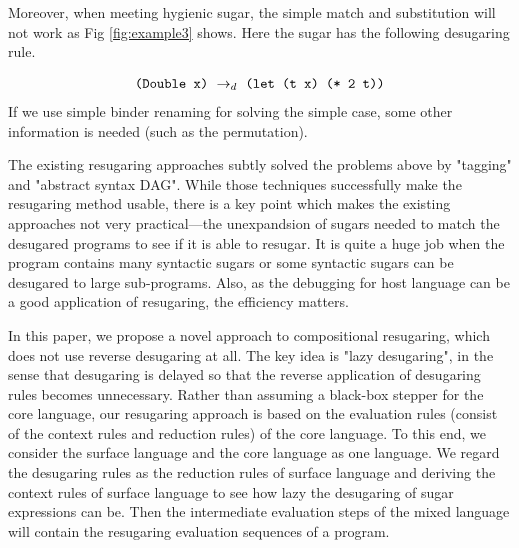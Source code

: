 Moreover, when meeting hygienic sugar, the simple match and substitution will not work as Fig \ref{fig:example3} shows. Here the  sugar has the following desugaring rule.

\[
\begin{array}{l}
\texttt{(Double x)} ~\rightarrow_d~ \texttt{(let (t x) (* 2 t))}\\
\end{array}
\]
If we use simple binder renaming for solving the simple case, some other information is needed (such as the permutation).



The existing resugaring approaches subtly solved the problems above by "tagging"\cite{resugaring} and "abstract syntax DAG"\cite{hygienic}. While those techniques successfully make the resugaring method usable, there is a key point which makes the existing approaches not very practical---the unexpandsion of sugars needed to match the desugared programs to see if it is able to resugar. It is quite a huge job when the program contains many syntactic sugars or some syntactic sugars can be desugared to large sub-programs.
Also, as the debugging for host language can be a good application of resugaring, the efficiency matters.



\label{mark:mention}
In this paper, we propose a novel approach to compositional resugaring, which does not use reverse desugaring at all.
The key idea is "lazy desugaring", in the sense that desugaring is delayed so that the reverse application of desugaring rules becomes unnecessary. Rather than assuming a black-box stepper for the core language, our resugaring approach is based on the evaluation rules (consist of the context rules and reduction rules) of the core language.
To this end, we consider the surface language and the core language as one language. We regard the desugaring rules as the reduction rules of surface language and deriving the context rules of surface language to see how lazy the desugaring of sugar expressions can be. Then the intermediate evaluation steps of the mixed language will contain the resugaring evaluation sequences of a program.


